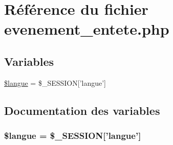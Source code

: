 \hypertarget{evenement__entete_8php}{
\section{R\'{e}f\'{e}rence du fichier evenement\_\-entete.php}
\label{evenement__entete_8php}
}
\subsection*{Variables}
\begin{CompactItemize}
\item 
\hyperlink{evenement__entete_8php_a0}{\$langue} = \$\_\-SESSION\mbox{[}'langue'\mbox{]}
\end{CompactItemize}


\subsection{Documentation des variables}
\hypertarget{evenement__entete_8php_a0}{
\subsubsection[\$langue]{\setlength{\rightskip}{0pt plus 5cm}\$langue = \$\_\-SESSION\mbox{[}'langue'\mbox{]}}}
\label{evenement__entete_8php_a0}


